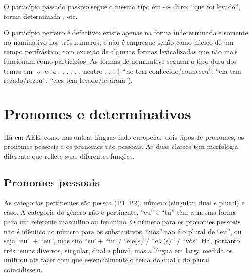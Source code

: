 O particípio passado passivo segue o mesmo tipo em -\emph{o}- duro:
 ``que foi levado'', forma determinada ,
etc.

O particípio perfeito é defectivo: existe apenas na forma indeterminada
e somente no nominativo nos três números, e não é empregue senão como
núcleo de um tempo perifrástico, com exceção de algumas formas
lexicalizadas que não mais funcionam como particípios. As formas de
nominativo seguem o tipo duro dos temas em -\emph{o}- e -\emph{a}-:
 ,  ,
 ;  ,
 , neutro ; 
,  ,  
( ``ele tem conhecido/conheceu'',  ``ela tem rezado/rezou'',  ``eles tem
levado/levaram'').


\section{Pronomes e determinativos}

Há em AEE, como nas outras línguas indo-europeias, dois tipos de
pronomes, os pronomes pessoais e os pronomes não pessoais. As duas
classes têm morfologia diferente que reflete suas diferentes funções.

\subsection{Pronomes pessoais}

As categorias pertinentes são pessoa (P1, P2), número (singular, dual e
plural) e caso. A categoria do gênero não é pertinente, ``eu'' e ``tu''
têm a mesma forma para um referente masculino ou feminino. O número para
os pronomes pessoais não é idêntico ao número para os substantivos,
``nós'' não é o plural de ``eu'', ou seja ``eu'' + ``eu'', mas sim
``eu''+ ``tu''/ ``ele(s)''/ ``ela(s)'' / ``vós''. Há, portanto, três
temas diversos, singular, dual e plural, mas a língua em larga medida os
unificou até fazer com que essencialmente o tema do dual e do plural
coincidissem.

